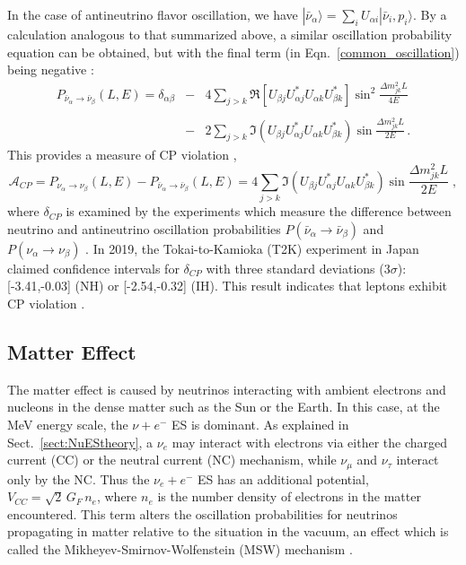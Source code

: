 In the case of antineutrino flavor oscillation, we have $|\bar{\nu}_\alpha\rangle=\sum_i U_{\alpha i}|\bar{\nu}_i,p_i\rangle$. By a calculation analogous to that summarized above, a similar oscillation probability equation can be obtained, but with the final term (in Eqn.~\ref{common_oscillation}) being negative \cite{aitchison2012gauge}:
\begin{eqnarray}\label{antiNu_eq1}
P_{\bar{\nu}_\alpha\to\bar{\nu}_\beta}(L,E)=\delta_{\alpha\beta} &-& 4\sum_{j>k} \Re[U_{\beta j}U^*_{\alpha j}U_{\alpha k}U^*_{\beta k}]\sin^2\frac{\Delta m^2_{jk}L}{4E} \nonumber\\
&\;& \\
&-& 2\sum_{j>k} \Im(U_{\beta j}U^*_{\alpha j}U_{\alpha k}U^*_{\beta k})\sin\frac{\Delta m^2_{jk}L}{2E} \nonumber \, .
\end{eqnarray}
This provides a measure of CP violation \cite{aitchison2012gauge},
\begin{equation}\label{cpV_eq1}
\mathcal{A}_{CP}=P_{\nu_\alpha\to\nu_\beta}(L,E)-P_{\bar{\nu}_\alpha\to\bar{\nu}_\beta}(L,E)=
4\sum_{j>k} \Im(U_{\beta j}U^*_{\alpha j}U_{\alpha k}U^*_{\beta k})\sin\frac{\Delta m^2_{jk}L}{2E} \;,
\end{equation}
where $\delta_{CP}$ is examined by the experiments which measure the difference between neutrino and antineutrino oscillation probabilities $P(\bar{\nu}_\alpha\to\bar{\nu}_\beta)$ and $P(\nu_\alpha\to\nu_\beta)$ \cite{xing2011neutrinos}. In 2019, the Tokai-to-Kamioka (T2K) experiment in Japan claimed confidence intervals for $\delta_{CP}$ with three standard deviations ($3\sigma$): [-3.41,-0.03] (NH) or [-2.54,-0.32] (IH). This result indicates that leptons exhibit CP violation \cite{abe2019constraint}.

\subsection{Matter Effect}\label{sect:MSW}

The matter effect is caused by neutrinos interacting with ambient electrons and nucleons in the dense matter such as the Sun or the Earth. In this case, at the MeV energy scale, the $\nu+e^-$ ES is dominant. As explained in Sect.~\ref{sect:NuEStheory}, a $\nu_e$ may interact with electrons via either the charged current (CC) or the neutral current (NC) mechanism, while $\nu_\mu$ and $\nu_\tau$ interact only by the NC. Thus the $\nu_e+e^-$ ES has an additional potential, $V_{CC} =\sqrt{2} \, G_F \, n_e$, where $n_e$ is the number density of electrons in the matter encountered. This term alters the oscillation probabilities for neutrinos propagating in matter relative to the situation in the vacuum, an effect which is called the Mikheyev-Smirnov-Wolfenstein (MSW) mechanism \cite{smirnov2016solar,smirnov2005msw}.

